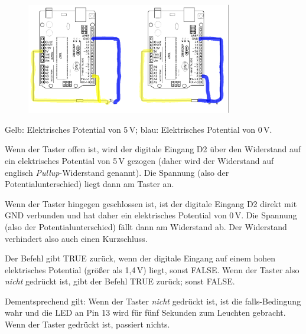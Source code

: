 \documentclass[ngerman, 11pt]{scrreprt}
\begin{document}
	\bigskip
	\begin{figure}[H]
		\centering
		\includegraphics[width=0.8\textwidth]{../Zeichnungen/schaltplan-pullup-markiert.png}
	\end{figure}
	
	Gelb: Elektrisches Potential von 5\,V; blau: Elektrisches Potential von 0\,V.
	
	Wenn der Taster offen ist, wird der digitale Eingang D2 über den Widerstand auf ein elektrisches Potential von 5\,V gezogen (daher wird der Widerstand auf englisch \emph{Pullup}-Widerstand genannt). Die Spannung (also der Potentialunterschied) liegt dann am Taster an. 
	
	Wenn der Taster hingegen geschlossen ist, ist der digitale Eingang D2 direkt mit GND verbunden und hat daher ein elektrisches Potential von 0\,V. Die Spannung (also der Potentialunterschied) fällt dann am Widerstand ab. Der Widerstand verhindert also auch einen Kurzschluss.
	
	Der Befehl  gibt TRUE zurück, wenn der digitale Eingang auf einem hohen elektrisches Potential (größer als 1,4\,V) liegt, sonst FALSE. Wenn der Taster also \emph{nicht} gedrückt ist, gibt der Befehl TRUE zurück; sonst FALSE. 
	
	Dementsprechend gilt: Wenn der Taster \emph{nicht} gedrückt ist, ist die falls-Bedingung wahr und die LED an Pin 13 wird für fünf Sekunden zum Leuchten gebracht. Wenn der Taster gedrückt ist, passiert nichts.
	
\end{document}
